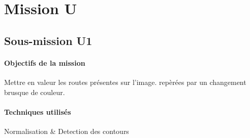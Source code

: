 \section{Mission U}
\subsection{Sous-mission U1}

	\begin{vwcol}[widths={0.65,0.2}, rule=0pt]
	\begin{minipage}{0.7\textwidth}
	\paragraph{Objectifs de la mission}

	Mettre en valeur les routes présentes sur l'image. repèrées par un changement brusque de couleur.
	\end{minipage}

	\begin{minipage}{0.3\textwidth}
	\begin{flushright}
	\paragraph{Techniques utilisés}

	Normalisation \& Detection des contours
	\end{flushright}
	\end{minipage}

	\end{vwcol} 

